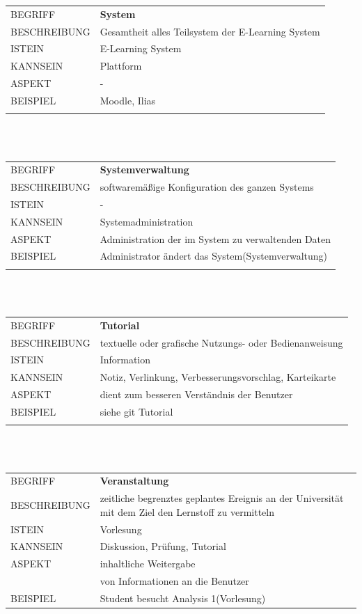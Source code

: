 \documentclass[12pt,a4paper]{article}
\begin{document}
\begin{tabular}{l p{12cm}} 
	BEGRIFF 	 & \textbf{System} \\ 
	BESCHREIBUNG & Gesamtheit alles Teilsystem der E-Learning System \\ 
	ISTEIN   	 & E-Learning System\\
	KANNSEIN 	 & Plattform\\ 
	ASPEKT   	 & -\\
	BEISPIEL 	 & Moodle, Ilias\\\\
	\hline
\end{tabular}\\\\  

\begin{tabular}{l p{12cm}}
	BEGRIFF 	 & \textbf{Systemverwaltung} \\ 
	BESCHREIBUNG & softwaremäßige Konfiguration des ganzen Systems\\ 
	ISTEIN   	 & -\\
	KANNSEIN 	 & Systemadministration\\ 
	ASPEKT   	 & Administration der im System zu verwaltenden Daten\\
	BEISPIEL 	 & Administrator ändert das System(Systemverwaltung)\\\\
	\hline
\end{tabular}\\\\  

\begin{tabular}{l p{12cm}}
	BEGRIFF 	 & \textbf{Tutorial} \\ 
	BESCHREIBUNG & textuelle oder grafische Nutzungs- oder 							   Bedienanweisung \\ 
	ISTEIN   	 & Information\\
	KANNSEIN 	 & Notiz, Verlinkung, Verbesserungsvorschlag, Karteikarte\\ 
	ASPEKT   	 & dient zum besseren Verständnis der Benutzer\\
	BEISPIEL 	 & siehe git Tutorial\\\\
	\hline
\end{tabular}\\\\  

\begin{tabular}{l p{12cm}}
	BEGRIFF 	 & \textbf{Veranstaltung} \\ 
	BESCHREIBUNG & zeitliche begrenztes geplantes Ereignis an der Universität mit 				   dem Ziel den Lernstoff zu vermitteln\\ 
	ISTEIN   	 & Vorlesung\\
	KANNSEIN 	 & Diskussion, Prüfung, Tutorial\\ 
	ASPEKT   	 & inhaltliche Weitergabe\\
	& von Informationen an die Benutzer\\
	BEISPIEL 	 & Student besucht Analysis 1(Vorlesung)\\
	\hline
\end{tabular}\\\\  
\end{document}

